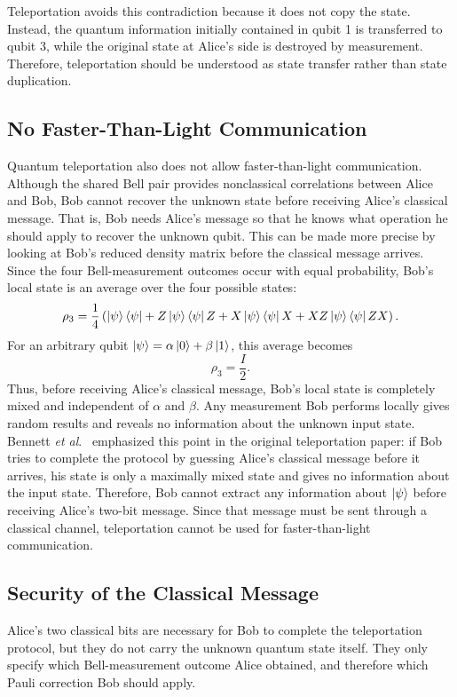 \documentclass[aps,prd,preprint,floats,epsf,superscriptaddress,nofootinbib]{revtex4}
\begin{document}
Teleportation avoids this contradiction because it does not copy the 
state. Instead, the quantum information initially contained in qubit 1 
is transferred to qubit 3, while the original state at Alice's side is 
destroyed by measurement. Therefore, teleportation should be understood 
as state transfer rather than state duplication.
\subsection{No Faster-Than-Light Communication}
Quantum teleportation also does not allow faster-than-light 
communication. Although the shared Bell pair provides nonclassical correlations between Alice and Bob, Bob cannot recover the unknown state before receiving Alice's classical message. That is, Bob needs Alice's message so that he knows what operation he should apply to recover the unknown qubit. 
This can be made more precise by looking at Bob's reduced density matrix 
before the classical message arrives. Since the four Bell-measurement 
outcomes occur with equal probability, Bob's local state is an average 
over the four possible states:
\begin{equation}
    \rho_3 = \frac{1}{4}\left(
    \ket{\psi}\bra{\psi}
    + Z\ket{\psi}\bra{\psi}Z
    + X\ket{\psi}\bra{\psi}X
    + XZ\ket{\psi}\bra{\psi}ZX
    \right).
\end{equation}
For an arbitrary qubit $\ket{\psi}=\alpha\ket{0}+\beta\ket{1}$, 
this average becomes
\begin{equation}
    \rho_3 = \frac{I}{2}.
\end{equation}
Thus, before receiving Alice's classical message, Bob's local state is 
completely mixed and independent of $\alpha$ and $\beta$. Any 
measurement Bob performs locally gives random results and reveals no information about the unknown input state. Bennett \textit{et al}.~\cite{Bennett} emphasized this point in the original teleportation paper: if Bob tries to complete the protocol by guessing Alice's classical message before it arrives, his state is only a maximally mixed state and gives no information about the input state. Therefore, Bob cannot extract any information about $\ket{\psi}$ before receiving Alice's two-bit message. Since that message must be sent through a classical channel, teleportation cannot be used for faster-than-light communication.
\subsection{Security of the Classical Message}
Alice's two classical bits are necessary for Bob to complete the teleportation protocol, but they do not carry the unknown quantum state itself. They only specify which Bell-measurement outcome Alice obtained, and therefore which Pauli correction Bob should apply.
\end{document}
